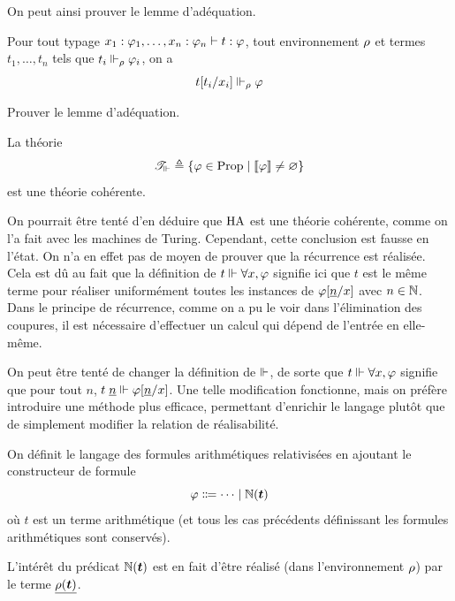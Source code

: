\noindent
On peut ainsi prouver le lemme d'adéquation.

\begin{lemma}[Adéquation]
  Pour tout typage $x_1:\varphi_1,\ldots,x_n:\varphi_n\vdash t : \varphi$, tout
  environnement $\rho$ et termes $t_1,\ldots,t_n$ tels que
  $t_i \Vdash_\rho \varphi_i$, on a
  \[t[t_i/x_i] \Vdash_\rho\varphi\]
\end{lemma}

\begin{exercise}
  Prouver le lemme d'adéquation.
\end{exercise}

\begin{corollary}
  La théorie
  \[\mathscr T_{\Vdash} \triangleq
  \left\{ \varphi\in\operatorname{Prop} \;\middle\vert\; \llbracket\varphi\rrbracket\neq\varnothing \right\}\]
  est une théorie cohérente.
\end{corollary}

On pourrait être tenté d'en déduire que $\operatorname{HA}$ est une théorie cohérente, comme
on l'a fait avec les machines de Turing. Cependant, cette conclusion est fausse
en l'état. On n'a en effet pas de moyen de prouver que la récurrence est
réalisée. Cela est dû au fait que la définition de $t\Vdash \forall x, \varphi$
signifie ici que $t$ est le même terme pour réaliser uniformément toutes les
instances de $\varphi[\underline{n}/x]$ avec $n \in \mathbb N$. Dans le principe de
récurrence, comme on a pu le voir dans l'élimination des coupures, il est
nécessaire d'effectuer un calcul qui dépend de l'entrée en elle-même.

On peut être tenté de changer la définition de $\Vdash$, de sorte que
$t\Vdash \forall x, \varphi$ signifie que pour tout $n$,
$t\;\underline{n} \Vdash\varphi[\underline{n}/x]$. Une telle modification fonctionne,
mais on préfère introduire une méthode plus efficace, permettant d'enrichir le
langage plutôt que de simplement modifier la relation de réalisabilité.

\begin{definition}
  On définit le langage des formules arithmétiques relativisées en ajoutant le
  constructeur de formule
  \[\varFF \inddefeq \cdots \mid \bN(\btermt)\]
  où $t$ est un terme arithmétique (et tous les cas précédents définissant les
  formules arithmétiques sont conservés).
\end{definition}

L'intérêt du prédicat $\mathbb N(\bm{t})$ est en fait d'être réalisé (dans
l'environnement $\rho$) par le terme $\underline{\rho(\bm{t})}$.

